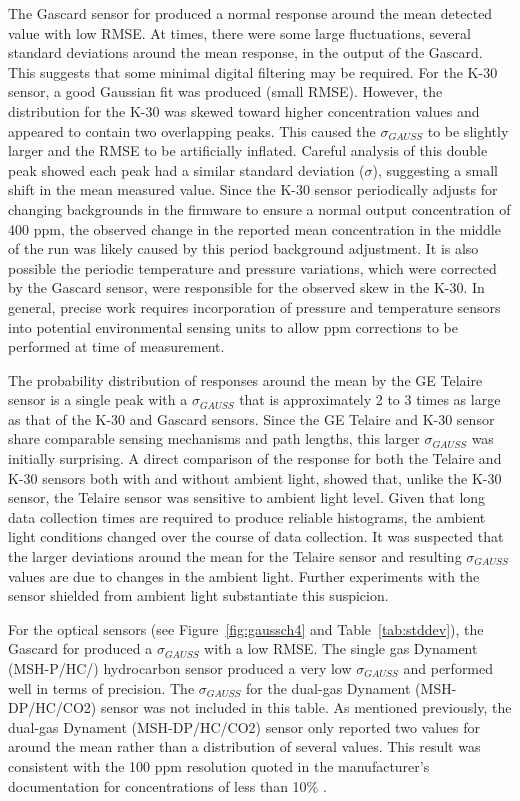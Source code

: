 \documentclass[sensors,article,submit,moreauthors,pdftex]{Definitions/mdpi}
\begin{document}
			The Gascard sensor for  produced a normal response around the mean detected value with low RMSE.
			At times, there were some large fluctuations, several standard deviations around the mean response, in the output of the Gascard.
			This suggests that some minimal digital filtering may be required.
			For the K-30 sensor, a good Gaussian fit was produced (small RMSE).
			However, the distribution for the K-30 was skewed toward higher concentration values and appeared to contain two overlapping peaks.
			This caused the $\sigma_{GAUSS}$ to be slightly larger and the RMSE to be artificially inflated.
			Careful analysis of this double peak showed each peak had a similar standard deviation ($\sigma$), suggesting a small shift in the mean measured value.
			Since the K-30 sensor periodically adjusts for changing backgrounds in the firmware to ensure a normal output concentration of 400 ppm, the observed change in the reported mean concentration in the middle of the run was likely caused by this period background adjustment.
			It is also possible the periodic temperature and pressure variations, which were corrected by the Gascard sensor, were responsible for the observed skew in the K-30.
			In general, precise work requires incorporation of pressure and temperature sensors into potential environmental sensing units to allow ppm corrections to be performed at time of measurement.
			
			
			The probability distribution of responses around the mean by the GE Telaire sensor is a single peak with a $\sigma_{GAUSS}$ that is approximately 2 to 3 times as large as that of the K-30 and Gascard sensors.
			Since the GE Telaire and K-30 sensor share comparable sensing mechanisms and path lengths, this larger $\sigma_{GAUSS}$ was initially surprising.
			A direct comparison of the response for both the Telaire and K-30 sensors both with and without ambient light, showed that, unlike the K-30 sensor, the Telaire sensor was sensitive to ambient light level.
			Given that long data collection times are required to produce reliable histograms, the ambient light conditions changed over the course of data collection.
			It was suspected that the larger deviations around the mean for the Telaire sensor and resulting $\sigma_{GAUSS}$ values are due to changes in the ambient light.
			Further experiments with the sensor shielded from ambient light substantiate this suspicion.
			
			
			For the optical  sensors (see Figure~\ref{fig:gaussch4} and Table~\ref{tab:stddev}), the Gascard for  produced a $\sigma_{GAUSS}$ with a low RMSE.
			The single gas Dynament (MSH-P/HC/) hydrocarbon sensor produced a very low $\sigma_{GAUSS}$ and performed well in terms of precision.
			The $\sigma_{GAUSS}$ for the dual-gas Dynament (MSH-DP/HC/CO2) sensor was not included in this table.
			As mentioned previously, the dual-gas Dynament (MSH-DP/HC/CO2) sensor only reported two values for  around the mean rather than a distribution of several values.
			This result was consistent with the 100 ppm resolution quoted in the manufacturer's documentation for concentrations of less than 10\% .
			
\end{document}
